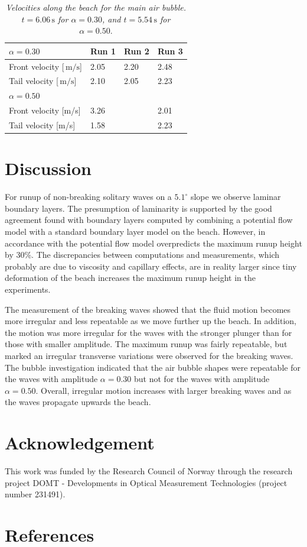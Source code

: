 \documentclass[review, authoryear]{elsarticle}
\newcommand{\s}{\,\mbox{s}}
\newcommand{\mps}{\,\mbox{m/s}}
\begin{document}
 
\begin{table}[]
\centering
\caption{\textit{ Velocities along the beach for the main air bubble. $t=6.06\s$ for $\alpha=0.30$, and $t=5.54\s$ for $\alpha=0.50$}.}
\label{vel_bubb}
\begin{tabular}{llll}
\hline
{\bf $\alpha=0.30$}                    & Run 1 & Run 2 & Run 3 \\ \hline
Front velocity {[}$\mps${]}  & 2.05  & 2.20  & 2.48  \\
Tail velocity {[}$\mps${]}  & 2.10  & 2.05  & 2.23  \\ \hline
{\bf $\alpha=0.50$}                    &       &       &       \\ \hline
Front velocity {[}m/s{]}  & 3.26  &   & 2.01  \\
Tail velocity {[}m/s{]}   & 1.58  &   & 2.23 
\end{tabular}
\end{table} 
 
 
\section{Discussion}
\label{con_rem}

For runup of non-breaking solitary waves on a $5.1^\circ$ slope we 
observe laminar boundary layers. The presumption of laminarity is
 supported by the good agreement found with boundary layers computed 
by combining a potential flow model with a standard boundary layer model on the beach. However, in accordance with \cite{pedersen2013runup} the
potential flow model overpredicts the
maximum runup height by  30\%.  
The discrepancies between computations and measurements, which probably are due to viscosity and capillary effects, are in reality larger since tiny deformation of the beach increases the maximum runup height in the experiments.

The measurement of the breaking waves showed that the fluid motion becomes more irregular and less repeatable as we move further up the beach. In addition, the motion was more irregular for the waves with the stronger plunger than for those with smaller amplitude. The maximum runup was fairly repeatable, but marked an irregular
transverse  variations were observed for the breaking waves. The bubble investigation indicated
 that the air bubble shapes  were repeatable  for the waves with amplitude $\alpha=0.30$ but not for the waves with amplitude $\alpha=0.50$. Overall, irregular motion increases with larger breaking waves and as the waves propagate upwards the beach.  

\section*{Acknowledgement}

This work was funded by the Research Council of Norway through the research project DOMT - Developments in Optical Measurement Technologies (project number 231491).

\section*{References}

 
\end{document}
